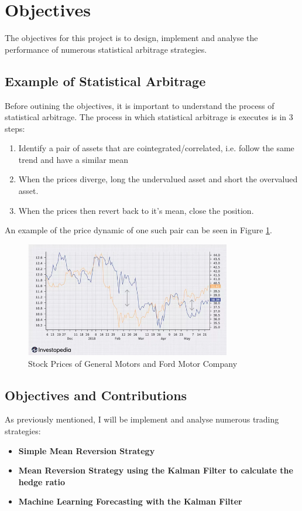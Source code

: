 \section{Objectives}
The objectives for this project is to design, implement and analyse the performance of numerous statistical arbitrage strategies.
\subsection{Example of Statistical Arbitrage}
Before outining the objectives, it is important to understand the process of statistical arbitrage. The process in which statistical arbitrage is executes is in 3 steps:
\begin{enumerate}
    \item Identify a pair of assets that are cointegrated/correlated, i.e. follow the same trend and have a similar mean
    \item When the prices diverge, long the undervalued asset and short the overvalued asset.
    \item When the prices then revert back to it's mean, close the position.
\end{enumerate}
An example of the price dynamic of one such pair can be seen in Figure \ref{fig:stat_arb_example}.

\begin{figure}[htb!]
    \centering
    \includegraphics[width=0.8\textwidth]{introduction/Images/stat_arb_example.png}
    \caption{Stock Prices of General Motors and Ford Motor Company~\cite{noauthor_statistical_nodate}}
    \label{fig:stat_arb_example}
\end{figure}

\subsection{Objectives and Contributions}
As previously mentioned, I will be implement and analyse numerous trading strategies:
\begin{itemize}
    \item \textbf{Simple Mean Reversion Strategy}
    \item \textbf{Mean Reversion Strategy using the Kalman Filter to calculate the hedge ratio}
    \item \textbf{Machine Learning Forecasting with the Kalman Filter}
\end{itemize}